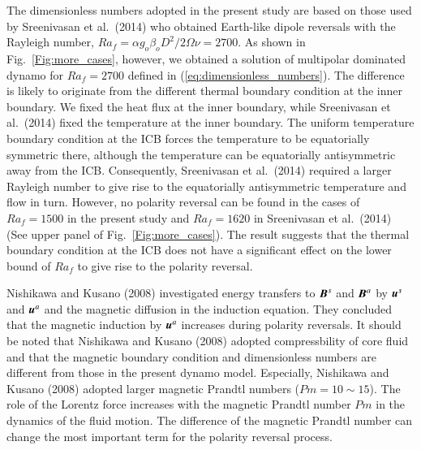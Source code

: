 {\color{teal}
The dimensionless numbers adopted in the present study are based on those used by Sreenivasan et al.\ (2014) who obtained Earth-like dipole reversals with the Rayleigh number, $Ra_f = \alpha g_o \beta_o D^2 / 2\Omega \nu = 2700$.
}
As shown in Fig.~\ref{Fig:more_cases}, however, we obtained a solution of multipolar dominated dynamo for $Ra_f = 2700$
{\color{teal}
defined in (\ref{eq:dimensionless_numbers}).
}
The difference is likely to originate from the different thermal boundary condition at the inner boundary. 
We fixed the heat flux at the inner boundary, while Sreenivasan et al.\ (2014) fixed the temperature at the inner boundary. 
{\color{teal}
The uniform temperature boundary condition at the ICB forces the temperature to be equatorially symmetric there, although the temperature can be equatorially antisymmetric away from the ICB.
}
Consequently, Sreenivasan et al.\ (2014) required a larger Rayleigh number to give rise to the equatorially antisymmetric temperature and flow in turn. 
However, no polarity reversal can be found in the cases of $Ra_f = 1500$ in the present study and $Ra_f = 1620$ in Sreenivasan et al.\ (2014) (See {\color{magenta}upper} panel of Fig.~\ref{Fig:more_cases}). 
The result suggests that the thermal boundary condition at the ICB does not have a significant effect on the lower bound of $Ra_f$ to give rise to the polarity reversal.



Nishikawa and Kusano (2008) %
investigated energy transfers to $\mbox{\boldmath$B$}^s$ and $\mbox{\boldmath$B$}^a$ by $\mbox{\boldmath$u$}^s$ and $\mbox{\boldmath$u$}^a$ and the magnetic diffusion in the induction equation.
They concluded that the magnetic induction by $\mbox{\boldmath$u$}^a$ increases during polarity reversals. 
It should be noted that Nishikawa and Kusano (2008) adopted compressbility of core fluid and that the magnetic boundary condition and dimensionless numbers are different from those in the present dynamo model.
Especially, Nishikawa and Kusano (2008) adopted larger magnetic Prandtl numbers ($Pm = 10 \sim 15$). 
The role of the Lorentz force increases with the magnetic Prandtl number $Pm$ in the dynamics of the fluid motion.
The difference of the magnetic Prandtl number can change the most important term for the polarity reversal process. 

